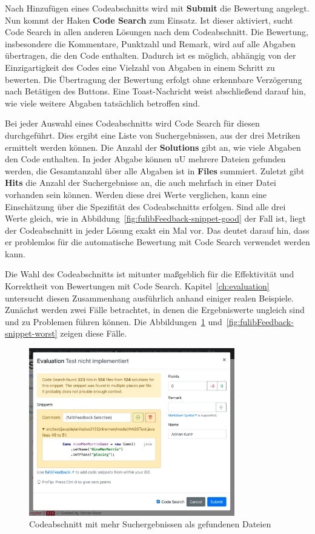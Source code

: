 Nach Hinzufügen eines Codeabschnitts wird mit \textbf{Submit} die Bewertung angelegt.
Nun kommt der Haken \textbf{Code Search} zum Einsatz.
Ist dieser aktiviert, sucht Code Search in allen anderen Lösungen nach dem Codeabschnitt.
Die Bewertung, insbesondere die Kommentare, Punktzahl und Remark, wird auf alle Abgaben übertragen, die den Code enthalten.
Dadurch ist es möglich, abhängig von der Einzigartigkeit des Codes eine Vielzahl von Abgaben in einem Schritt zu bewerten.
Die Übertragung der Bewertung erfolgt ohne erkennbare Verzögerung nach Betätigen des Buttons.
Eine Toast-Nachricht weist abschließend darauf hin, wie viele weitere Abgaben tatsächlich betroffen sind.

Bei jeder Auswahl eines Codeabschnitts wird Code Search für diesen durchgeführt.
Dies ergibt eine Liste von Suchergebnissen, aus der drei Metriken ermittelt werden können.
Die Anzahl der \textbf{Solutions} gibt an, wie viele Abgaben den Code enthalten.
In jeder Abgabe können \ac{uU} mehrere Dateien gefunden werden, die Gesamtanzahl über alle Abgaben ist in \textbf{Files} summiert.
Zuletzt gibt \textbf{Hits} die Anzahl der Suchergebnisse an, die auch mehrfach in einer Datei vorhanden sein können.
Werden diese drei Werte verglichen, kann eine Einschätzung über die Spezifität des Codeabschnitts erfolgen.
Sind alle drei Werte gleich, wie in Abbildung~\ref{fig:fulibFeedback-snippet-good} der Fall ist, liegt der Codeabschnitt in jeder Lösung exakt ein Mal vor.
Das deutet darauf hin, dass er problemlos für die automatische Bewertung mit Code Search verwendet werden kann.

Die Wahl des Codeabschnitts ist mitunter maßgeblich für die Effektivität und Korrektheit von Bewertungen mit Code Search.
Kapitel~\ref{ch:evaluation} untersucht diesen Zusammenhang ausführlich anhand einiger realen Beispiele.
Zunächst werden zwei Fälle betrachtet, in denen die Ergebniswerte ungleich sind und zu Problemen führen können.
Die Abbildungen~\ref{fig:fulibFeedback-snippet-bad} und~\ref{fig:fulibFeedback-snippet-worst} zeigen diese Fälle.

\begin{figure}
    \centering
    \includegraphics[width=0.8\textwidth]{images/fulibFeedback-snippet-bad}
    \caption{Codeabschnitt mit mehr Suchergebnissen als gefundenen Dateien}
    \label{fig:fulibFeedback-snippet-bad}
\end{figure}

